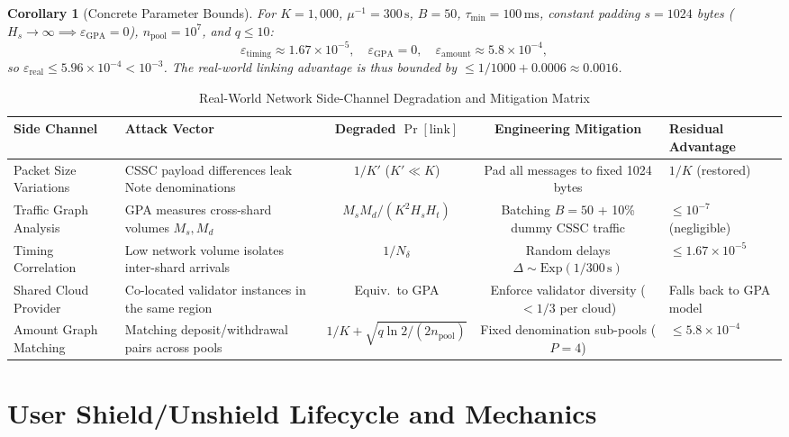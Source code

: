 \documentclass[sigconf,nonacm]{acmart}
\newtheorem{corollary}{Corollary}
\begin{document}
\begin{corollary}[Concrete Parameter Bounds]
For $K = 1{,}000$, $\mu^{-1} = 300\,\text{s}$, $B = 50$, $\tau_{\min} = 100\,\text{ms}$, constant padding $s = 1024$ bytes ($H_s \to \infty \implies \varepsilon_{\text{GPA}} = 0$), $n_{\text{pool}} = 10^7$, and $q \le 10$:
\begin{equation}
\varepsilon_{\text{timing}} \approx 1.67 \times 10^{-5}, \quad \varepsilon_{\text{GPA}} = 0, \quad \varepsilon_{\text{amount}} \approx 5.8 \times 10^{-4},
\end{equation}
so $\varepsilon_{\text{real}} \le 5.96 \times 10^{-4} < 10^{-3}$. The real-world linking advantage is thus bounded by $\le 1/1000 + 0.0006 \approx 0.0016$.
\end{corollary}

\begin{table}[t]
\centering
\caption{Real-World Network Side-Channel Degradation and Mitigation Matrix}
\label{tab:side_channel_matrix}
\small
\begin{tabularx}{\textwidth}{lXccX}
\toprule
\textbf{Side Channel} & \textbf{Attack Vector} & \textbf{Degraded $\Pr[\text{link}]$} & \textbf{Engineering Mitigation} & \textbf{Residual Advantage} \\
\midrule
Packet Size Variations & CSSC payload differences leak Note denominations & $1/K'$ ($K' \ll K$) & Pad all messages to fixed 1024 bytes & $1/K$ (restored) \\
Traffic Graph Analysis & GPA measures cross-shard volumes $M_s, M_d$ & $M_s M_d / (K^2 H_s H_t)$ & Batching $B=50$ + 10\% dummy CSSC traffic & $\le 10^{-7}$ (negligible) \\
Timing Correlation & Low network volume isolates inter-shard arrivals & $1/N_\delta$ & Random delays $\Delta \sim \text{Exp}(1/300\,\text{s})$ & $\le 1.67 \times 10^{-5}$ \\
Shared Cloud Provider & Co-located validator instances in the same region & Equiv.\ to GPA & Enforce validator diversity ($< 1/3$ per cloud) & Falls back to GPA model \\
Amount Graph Matching & Matching deposit/withdrawal pairs across pools & $1/K + \sqrt{q\ln 2 / (2n_{\text{pool}})}$ & Fixed denomination sub-pools ($P=4$) & $\le 5.8 \times 10^{-4}$ \\
\bottomrule
\end{tabularx}
\end{table}

\section{User Shield/Unshield Lifecycle and Mechanics}
\end{document}
